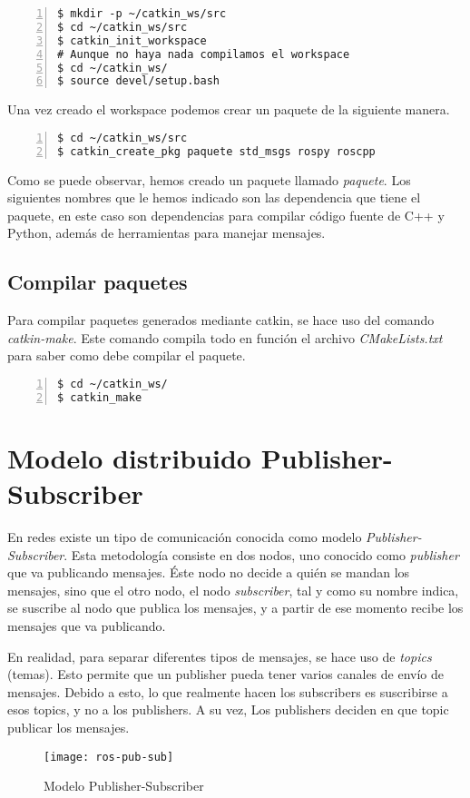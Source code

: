 		\begin{lstlisting}[style=consola,numbers=left]
$ mkdir -p ~/catkin_ws/src
$ cd ~/catkin_ws/src
$ catkin_init_workspace
# Aunque no haya nada compilamos el workspace
$ cd ~/catkin_ws/
$ source devel/setup.bash
		\end{lstlisting}
		
		Una vez creado el workspace podemos crear un paquete de la siguiente manera.
		
		\begin{lstlisting}[style=consola,numbers=left]
$ cd ~/catkin_ws/src
$ catkin_create_pkg paquete std_msgs rospy roscpp
		\end{lstlisting}
		
		Como se puede observar, hemos creado un paquete llamado \textit{paquete}. Los siguientes nombres que le hemos indicado son las dependencia que tiene el paquete, en este caso son dependencias para compilar código fuente de C++ y Python, además de herramientas para manejar mensajes.
		
		\subsection{Compilar paquetes}
		
		Para compilar paquetes generados mediante catkin, se hace uso del comando \emph{catkin-make}. Este comando compila todo en función el archivo \emph{CMakeLists.txt} para saber como debe compilar el paquete.
		
		\begin{lstlisting}[style=consola,numbers=left]
$ cd ~/catkin_ws/
$ catkin_make
		\end{lstlisting}
		
	\section{Modelo distribuido Publisher-Subscriber}
	
	En redes existe un tipo de comunicación conocida como modelo \emph{Publisher-Subscriber}. Esta metodología consiste en dos nodos, uno conocido como \emph{publisher} que va publicando mensajes. Éste nodo no decide a quién se mandan los mensajes, sino que el otro nodo, el nodo \emph{subscriber}, tal y como su nombre indica, se suscribe al nodo que publica los mensajes, y a partir de ese momento recibe los mensajes que va publicando.
	
	En realidad, para separar diferentes tipos de mensajes, se hace uso de \emph{topics} (temas). Esto permite que un publisher pueda tener varios canales de envío de mensajes. Debido a esto, lo que realmente hacen los subscribers es suscribirse a esos topics, y no a los publishers. A su vez, Los publishers deciden en que topic publicar los mensajes.
	
	\begin{figure}[H]
		\centering
		\texttt{[image: ros-pub-sub]}
		\caption{Modelo Publisher-Subscriber}
		\label{fig:ros-pub-sub}
	\end{figure}